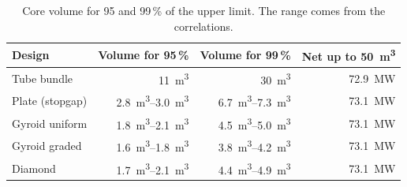 \documentclass[10pt,a4paper]{article}
\begin{document}
\begin{table}[H]\centering\small
\begin{tabular}{lrrr}\toprule
Design & Volume for 95\,\% & Volume for 99\,\% & Net up to \SI{50}{m^3}\\\midrule
Tube bundle & \SI{11}{m^3} & \SI{30}{m^3} & \SI{72.9}{MW}\\
Plate (stopgap) & \SIrange{2.8}{3.0}{m^3} & \SIrange{6.7}{7.3}{m^3} & \SI{73.1}{MW}\\
Gyroid uniform & \SIrange{1.8}{2.1}{m^3} & \SIrange{4.5}{5.0}{m^3} & \SI{73.1}{MW}\\
Gyroid graded & \SIrange{1.6}{1.8}{m^3} & \SIrange{3.8}{4.2}{m^3} & \SI{73.1}{MW}\\
Diamond & \SIrange{1.7}{2.1}{m^3} & \SIrange{4.4}{4.9}{m^3} & \SI{73.1}{MW}\\\bottomrule
\end{tabular}\caption{Core volume for 95 and 99\,\% of the upper limit. The range comes from the correlations.}\end{table}
\end{document}
